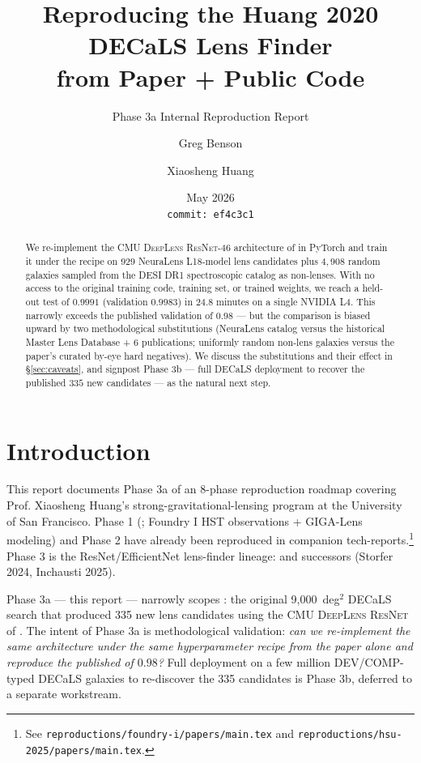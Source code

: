 \documentclass[11pt,letterpaper]{article}
\title{Reproducing the Huang 2020 DECaLS Lens Finder\\
       from Paper + Public Code}
\author{Greg Benson \and Xiaosheng Huang}
\date{May 2026 \\ \texttt{commit:~ef4c3c1}}
\newcommand{\ResNet}{\textsc{ResNet}}
\newcommand{\Lanusse}{\textsc{CMU DeepLens}}
\begin{document}
\maketitle
\subtitle{Phase 3a Internal Reproduction Report}

\begin{abstract}
We re-implement the \Lanusse{} \ResNet-46 architecture of
\textcite{lanusse2018cmu} in PyTorch and train it under the
\textcite{huang2020decals} recipe on $929$ NeuraLens L18-model lens
candidates plus $4{,}908$ random galaxies sampled from the DESI DR1
spectroscopic catalog as non-lenses. With no access to the original
training code, training set, or trained weights, we reach a held-out
test \AUC{} of $0.9991$ (validation \AUC{} $0.9983$) in $24.8$ minutes
on a single NVIDIA L4. This narrowly exceeds the published
\textcite{huang2020decals} validation \AUC{} of $0.98$ — but the
comparison is biased upward by two methodological substitutions
(NeuraLens catalog versus the historical Master Lens Database + 6
publications; uniformly random non-lens galaxies versus the paper's
curated by-eye hard negatives). We discuss the substitutions and
their effect in \S\ref{sec:caveats}, and signpost Phase 3b — full
DECaLS deployment to recover the published $335$ new candidates — as
the natural next step.
\end{abstract}

\tableofcontents

\bigskip

\section{Introduction}

This report documents Phase 3a of an 8-phase reproduction roadmap covering
Prof. Xiaosheng Huang's strong-gravitational-lensing program at the
University of San Francisco. Phase 1 (\textcite{huang2025foundry1};
Foundry I HST observations + GIGA-Lens modeling) and Phase 2
\autocite{hsu2025pairwise} have already been reproduced in companion
tech-reports.\footnote{See \texttt{reproductions/foundry-i/papers/main.tex}
and \texttt{reproductions/hsu-2025/papers/main.tex}.} Phase 3 is the
ResNet/EfficientNet lens-finder lineage:
\textcite{huang2020decals,huang2021desi} and successors (Storfer 2024,
Inchausti 2025).

Phase 3a — this report — narrowly scopes \textcite{huang2020decals}: the
original 9{,}000~deg$^2$ DECaLS search that produced 335 new lens
candidates using the \Lanusse{} \ResNet{} of \textcite{lanusse2018cmu}.
The intent of Phase 3a is methodological validation: \emph{can we
re-implement the same architecture under the same hyperparameter recipe
from the paper alone and reproduce the published \AUC{} of $0.98$?}
Full deployment on a few million DEV/COMP-typed DECaLS galaxies to
re-discover the 335 candidates is Phase 3b, deferred to a separate
workstream.
\end{document}
